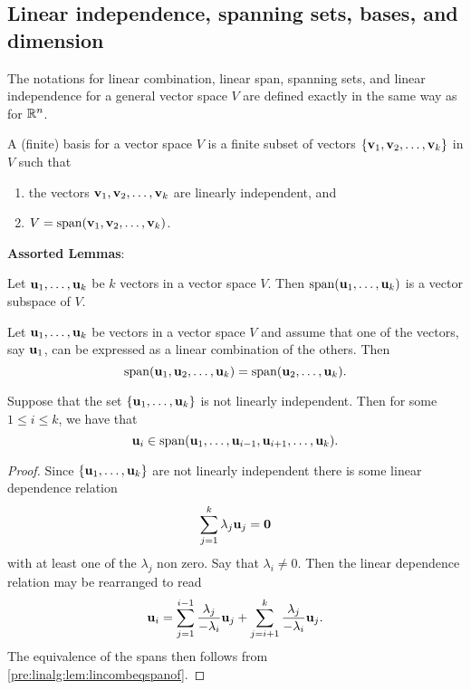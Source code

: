 \documentclass[10pt, a4paper]{article}
\begin{document}
\subsection{Linear independence, spanning sets, bases, and dimension}
The notations for linear combination, linear span, spanning sets, and linear independence for a general vector space $V$ are defined exactly in the same way as for $\mathbb{R} ^ n$.
\begin{definition}[Basis]
    A (finite) basis for a vector space $V$ is a finite subset of vectors $\{\mathbf{v}_1, \mathbf{v}_2, \dotsc, \mathbf{v}_k\}$ in $V$ such that
    \begin{enumerate}[label = (\roman*)]
        \item the vectors $\mathbf{v}_1, \mathbf{v}_2, \dotsc, \mathbf{v}_k$ are linearly independent,
        and
        \item $V = \mathrm{span}(\mathbf{v}_1, \mathbf{v}_2, \dotsc, \mathbf{v}_k)$.
    \end{enumerate}
\end{definition}

\textbf{Assorted Lemmas}:
\begin{lemma}
    Let $\mathbf{u}_1, \dotsc, \mathbf{u}_k$ be $k$ vectors in a vector space $V$.
    Then $\mathrm{span}(\mathbf{u}_1, \dotsc, \mathbf{u}_k)$ is a vector subspace of $V$.
\end{lemma}
\begin{lemma}\label{pre:linalg:lem:lincombeqspanof}
    Let $\mathbf{u}_1, \dotsc, \mathbf{u}_k$ be vectors in a vector space $V$ and assume that one of the vectors,
    say $\mathbf{u}_1$,
    can be expressed as a linear combination of the others.
    Then
    \[
    \mathrm{span}(\mathbf{u}_1, \mathbf{u}_2, \dotsc, \mathbf{u}_k) = \mathrm{span}(\mathbf{u}_2, \dotsc, \mathbf{u}_k).
    \]
\end{lemma}
\begin{lemma}
    Suppose that the set $\{\mathbf{u}_1, \dotsc, \mathbf{u}_k\}$ is not linearly independent.
    Then for some $1 \leq i \leq k$,
    we have that
    \[
    \mathbf{u}_i \in \mathrm{span}(\mathbf{u}_1, \dotsc, \mathbf{u}_{i - 1}, \mathbf{u}_{i + 1}, \dotsc, \mathbf{u}_k).
    \]
    \begin{proof}
        Since $\{\mathbf{u}_1, \dotsc, \mathbf{u}_k\}$ are not linearly independent there is some linear dependence relation
        \[
        \sum_{j = 1}^{k}\lambda_j\mathbf{u}_j = \mathbf{0}
        \]
        with at least one of the $\lambda_j$ non zero.
        Say that $\lambda_i \neq 0$.
        Then the linear dependence relation may be rearranged to read
        \[
        \mathbf{u}_i = \sum_{j = 1}^{i - 1}\frac{\lambda_j}{-\lambda_i}\mathbf{u}_j + \sum_{j = i + 1}^{k}\frac{\lambda_j}{-\lambda_i}\mathbf{u}_j.
        \]
        The equivalence of the spans then follows from \autoref{pre:linalg:lem:lincombeqspanof}.
    \end{proof}
\end{lemma}
\end{document}
